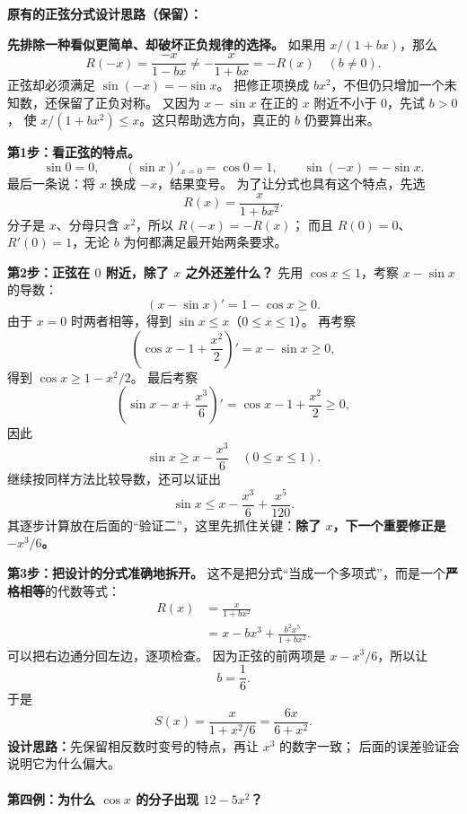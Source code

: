 \begin{proofbox}
\noindent\textbf{原有的正弦分式设计思路（保留）：}


\textbf{先排除一种看似更简单、却破坏正负规律的选择。}
如果用 $x/(1+bx)$，那么
\[
 R(-x)=\frac{-x}{1-bx}\ne-\frac{x}{1+bx}=-R(x)
 \quad(b\ne0).
\]
正弦却必须满足 $\sin(-x)=-\sin x$。
把修正项换成 $bx^2$，不但仍只增加一个未知数，还保留了正负对称。
又因为 $x-\sin x$ 在正的 $x$ 附近不小于 $0$，先试 $b>0$，
使 $x/(1+bx^2)\le x$。这只帮助选方向，真正的 $b$ 仍要算出来。

\textbf{第1步：看正弦的特点。}
\[
 \sin0=0,\qquad (\sin x)'_{x=0}=\cos0=1,
 \qquad \sin(-x)=-\sin x.
\]
最后一条说：将 $x$ 换成 $-x$，结果变号。
为了让分式也具有这个特点，先选
\[
 R(x)=\frac{x}{1+bx^2}.
\]
分子是 $x$、分母只含 $x^2$，所以 $R(-x)=-R(x)$；
而且 $R(0)=0$、$R'(0)=1$，无论 $b$ 为何都满足最开始两条要求。

\textbf{第2步：正弦在 $0$ 附近，除了 $x$ 之外还差什么？}
先用 $\cos x\le1$，考察 $x-\sin x$ 的导数：
\[
 (x-\sin x)'=1-\cos x\ge0.
\]
由于 $x=0$ 时两者相等，得到 $\sin x\le x$（$0\le x\le1$）。
再考察
\[
 \left(\cos x-1+\frac{x^2}{2}\right)'=x-\sin x\ge0,
\]
得到 $\cos x\ge1-x^2/2$。
最后考察
\[
 \left(\sin x-x+\frac{x^3}{6}\right)'=\cos x-1+\frac{x^2}{2}\ge0,
\]
因此
\[
 \boxed{\sin x\ge x-\frac{x^3}{6}\quad(0\le x\le1).}
\]
继续按同样方法比较导数，还可以证出
\[
 \sin x\le x-\frac{x^3}{6}+\frac{x^5}{120}.
\]
其逐步计算放在后面的“验证二”，这里先抓住关键：\textbf{除了 $x$，下一个重要修正是 $-x^3/6$。}

\textbf{第3步：把设计的分式准确地拆开。}
这不是把分式“当成一个多项式”，而是一个\textbf{严格相等}的代数等式：
\[
 \begin{aligned}
 R(x)&=\frac{x}{1+bx^2}\\
 &=x-bx^3+\frac{b^2x^5}{1+bx^2}.
 \end{aligned}
\]
可以把右边通分回左边，逐项检查。
因为正弦的前两项是 $x-x^3/6$，所以让
\[
 b=\frac16.
\]
于是
\[
 \boxed{S(x)=\frac{x}{1+x^2/6}=\frac{6x}{6+x^2}}.
\]
\textbf{设计思路：}先保留相反数时变号的特点，再让 $x^3$ 的数字一致；
后面的误差验证会说明它为什么偏大。

\newpage
\paragraph{第四例：为什么 $\cos x$ 的分子出现 $12-5x^2$？}


\end{proofbox}
